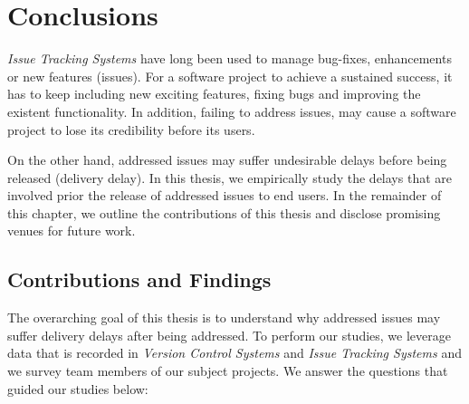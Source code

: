 \chapter[Conclusions]{Conclusions} \label{ch:conclusions}

{\em Issue Tracking Systems} have long been used to manage bug-fixes,
enhancements or new features (\ie issues). For a software project to achieve a
sustained success, it has to keep including new exciting features, fixing bugs
and improving the existent functionality. In addition, failing to address
issues, may cause a software project to lose its credibility before its users.

On the other hand, addressed issues may suffer undesirable delays before being
released (\eg delivery delay). In this thesis, we empirically study the
delays that are involved prior the release of addressed issues to end users. In
the remainder of this chapter, we outline the contributions of this thesis and
disclose promising venues for future work.

\section{Contributions and Findings}


The overarching goal of this thesis is to understand why addressed issues may
suffer delivery delays after being addressed. To perform our studies, we
leverage data that is recorded in {\em Version Control Systems} and {\em Issue
Tracking Systems} and we survey team members of our subject projects. We answer
the questions that guided our studies below:

